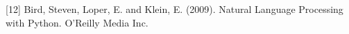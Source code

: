 \documentclass{article} %
\begin{document}
{[12] Bird, Steven, Loper, E. and Klein, E. (2009). Natural Language Processing with Python. O’Reilly Media Inc.





%
%



}
\end{document}
